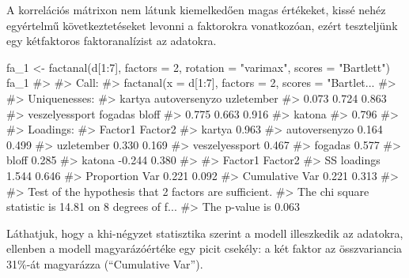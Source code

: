 \documentclass[
  letterpaper,
]{krantz}
\makeatletter
\newenvironment{Shaded}{\begin{snugshade}}{\end{snugshade}}
\newcommand{\AttributeTok}[1]{\textcolor[rgb]{0.40,0.45,0.13}{#1}}
\newcommand{\CommentTok}[1]{\textcolor[rgb]{0.37,0.37,0.37}{#1}}
\newcommand{\DecValTok}[1]{\textcolor[rgb]{0.68,0.00,0.00}{#1}}
\newcommand{\FunctionTok}[1]{\textcolor[rgb]{0.28,0.35,0.67}{#1}}
\newcommand{\NormalTok}[1]{\textcolor[rgb]{0.00,0.23,0.31}{#1}}
\newcommand{\OtherTok}[1]{\textcolor[rgb]{0.00,0.23,0.31}{#1}}
\newcommand{\SpecialCharTok}[1]{\textcolor[rgb]{0.37,0.37,0.37}{#1}}
\newcommand{\StringTok}[1]{\textcolor[rgb]{0.13,0.47,0.30}{#1}}
\newenvironment{kframe}{%
\medskip{}
\setlength{\fboxsep}{.8em}
 \def\at@end@of@kframe{}%
 \ifinner\ifhmode%
  \def\at@end@of@kframe{\end{minipage}}%
  \begin{minipage}{\columnwidth}%
 \fi\fi%
 \def\FrameCommand##1{\hskip\@totalleftmargin \hskip-\fboxsep
 \colorbox{shadecolor}{##1}\hskip-\fboxsep
     \hskip-\linewidth \hskip-\@totalleftmargin \hskip\columnwidth}%
 \MakeFramed {\advance\hsize-\width
   \@totalleftmargin\z@ \linewidth\hsize
   \@setminipage}}%
 {\par\unskip\endMakeFramed%
 \at@end@of@kframe}
\renewenvironment{Shaded}{\begin{kframe}}{\end{kframe}}
\makeatother
\begin{document}
A korrelációs mátrixon nem látunk kiemelkedően magas értékeket, kissé
nehéz egyértelmű következtetéseket levonni a faktorokra vonatkozóan,
ezért teszteljünk egy kétfaktoros faktoranalízist az adatokra.

\begin{Shaded}
\begin{Highlighting}[]
\NormalTok{fa\_1 }\OtherTok{\textless{}{-}} \FunctionTok{factanal}\NormalTok{(d[}\DecValTok{1}\SpecialCharTok{:}\DecValTok{7}\NormalTok{], }\AttributeTok{factors =} \DecValTok{2}\NormalTok{, }\AttributeTok{rotation =} \StringTok{"varimax"}\NormalTok{, }\AttributeTok{scores =} \StringTok{"Bartlett"}\NormalTok{)}
\NormalTok{fa\_1}
\CommentTok{\#\textgreater{} }
\CommentTok{\#\textgreater{} Call:}
\CommentTok{\#\textgreater{} factanal(x = d[1:7], factors = 2, scores = "Bartlet...}
\CommentTok{\#\textgreater{} }
\CommentTok{\#\textgreater{} Uniquenesses:}
\CommentTok{\#\textgreater{}         kartya  autoversenyzo     uzletember }
\CommentTok{\#\textgreater{}          0.073          0.724          0.863 }
\CommentTok{\#\textgreater{} veszelyessport        fogadas          bloff }
\CommentTok{\#\textgreater{}          0.775          0.663          0.916 }
\CommentTok{\#\textgreater{}         katona }
\CommentTok{\#\textgreater{}          0.796 }
\CommentTok{\#\textgreater{} }
\CommentTok{\#\textgreater{} Loadings:}
\CommentTok{\#\textgreater{}                Factor1 Factor2}
\CommentTok{\#\textgreater{} kartya          0.963         }
\CommentTok{\#\textgreater{} autoversenyzo   0.164   0.499 }
\CommentTok{\#\textgreater{} uzletember      0.330   0.169 }
\CommentTok{\#\textgreater{} veszelyessport          0.467 }
\CommentTok{\#\textgreater{} fogadas         0.577         }
\CommentTok{\#\textgreater{} bloff           0.285         }
\CommentTok{\#\textgreater{} katona         {-}0.244   0.380 }
\CommentTok{\#\textgreater{} }
\CommentTok{\#\textgreater{}                Factor1 Factor2}
\CommentTok{\#\textgreater{} SS loadings      1.544   0.646}
\CommentTok{\#\textgreater{} Proportion Var   0.221   0.092}
\CommentTok{\#\textgreater{} Cumulative Var   0.221   0.313}
\CommentTok{\#\textgreater{} }
\CommentTok{\#\textgreater{} Test of the hypothesis that 2 factors are sufficient.}
\CommentTok{\#\textgreater{} The chi square statistic is 14.81 on 8 degrees of f...}
\CommentTok{\#\textgreater{} The p{-}value is 0.063}
\end{Highlighting}
\end{Shaded}

Láthatjuk, hogy a khi-négyzet statisztika szerint a modell illeszkedik
az adatokra, ellenben a modell magyarázóértéke egy picit csekély: a két
faktor az összvariancia 31\%-át magyarázza (``Cumulative Var'').
\end{document}
